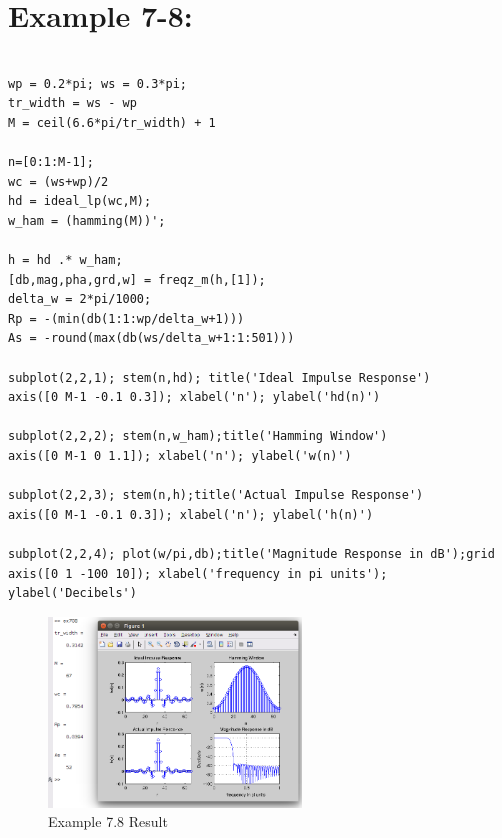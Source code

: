 \documentclass[11pt
  , a4paper
  , article
  , oneside
]{memoir}
\begin{document}
\chapter{Example 7-8:}
\begin{lstlisting}[style=termstyle]
% Example 7.8

wp = 0.2*pi; ws = 0.3*pi;
tr_width = ws - wp
M = ceil(6.6*pi/tr_width) + 1

n=[0:1:M-1];
wc = (ws+wp)/2
hd = ideal_lp(wc,M);
w_ham = (hamming(M))';

h = hd .* w_ham;
[db,mag,pha,grd,w] = freqz_m(h,[1]);
delta_w = 2*pi/1000;
Rp = -(min(db(1:1:wp/delta_w+1)))
As = -round(max(db(ws/delta_w+1:1:501)))

subplot(2,2,1); stem(n,hd); title('Ideal Impulse Response')
axis([0 M-1 -0.1 0.3]); xlabel('n'); ylabel('hd(n)')

subplot(2,2,2); stem(n,w_ham);title('Hamming Window')
axis([0 M-1 0 1.1]); xlabel('n'); ylabel('w(n)')

subplot(2,2,3); stem(n,h);title('Actual Impulse Response')
axis([0 M-1 -0.1 0.3]); xlabel('n'); ylabel('h(n)')

subplot(2,2,4); plot(w/pi,db);title('Magnitude Response in dB');grid
axis([0 1 -100 10]); xlabel('frequency in pi units'); ylabel('Decibels')
\end{lstlisting}

\begin{figure}[h!]
	\centering
	\includegraphics[width=0.6\textwidth,height=0.4\textwidth]{./images/ex708.png}
	\caption{Example 7.8 Result}
	\label{fig:Example 7.8 Result}
\end{figure}

\clearpage
\end{document}

